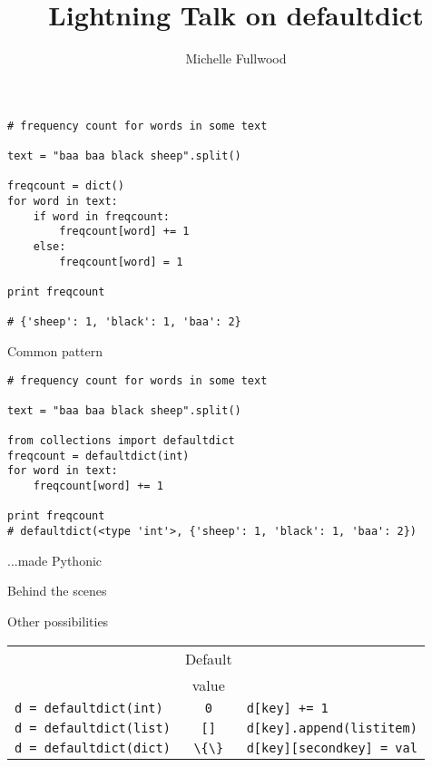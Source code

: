 \documentclass{beamer}
\title[defaultdict]{Lightning Talk on defaultdict}
\author{Michelle Fullwood}
\date{}
\begin{document}
\begin{frame}
\titlepage
\end{frame}


\begin{lrbox}{\mysavebox}
\begin{lstlisting}
# frequency count for words in some text

text = "baa baa black sheep".split()

freqcount = dict()
for word in text:
    if word in freqcount:
        freqcount[word] += 1
    else:
        freqcount[word] = 1

print freqcount

# {'sheep': 1, 'black': 1, 'baa': 2}

\end{lstlisting}
\end{lrbox}

\begin{frame}{Common pattern}
\vspace{1.5em}
{\usebox{\mysavebox}}
\vspace{1em}
\end{frame}


\begin{lrbox}{\mysavebox}
\begin{lstlisting}
# frequency count for words in some text

text = "baa baa black sheep".split()

from collections import defaultdict
freqcount = defaultdict(int)
for word in text:
    freqcount[word] += 1

print freqcount
# defaultdict(<type 'int'>, {'sheep': 1, 'black': 1, 'baa': 2})
\end{lstlisting}
\end{lrbox}

\begin{frame}{...made Pythonic}
\vspace{1.5em}
{\usebox{\mysavebox}}
\vspace{1em}
\end{frame}

\begin{frame}{Behind the scenes}
\end{frame}

\begin{frame}{Other possibilities}
 \begin{tabular}{lcl}
      & Default & \\
      & value   & \\
   \lstinline$d = defaultdict(int)$  & \lstinline$0$ & \lstinline$d[key] += 1$ \\
   \lstinline$d = defaultdict(list)$ & \lstinline$[]$ & \lstinline$d[key].append(listitem)$ \\
   \lstinline$d = defaultdict(dict)$ & \lstinline$\{\}$ & \lstinline$d[key][secondkey] = val$ \\
 \end{tabular}
\end{frame}
\end{document}

